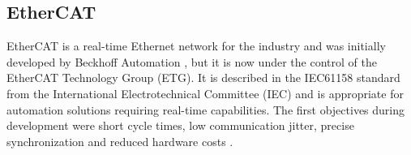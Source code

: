 \subsection{EtherCAT} \label{sec:ethercat}

EtherCAT is a real-time Ethernet network for the industry and was initially developed by Beckhoff Automation \cite{misc:beckhoff}, but it is now under the control of the EtherCAT Technology Group (ETG).
It is described in the IEC61158 standard from the International Electrotechnical Committee (IEC) and is appropriate for automation solutions requiring real-time capabilities.
The first objectives during development were short cycle times, low communication jitter, precise synchronization and reduced hardware costs \cite{protocol:ethercat}.












